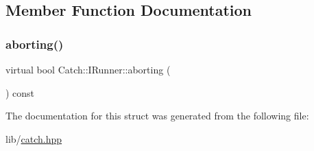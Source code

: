 \subsection{Member Function Documentation}
\hypertarget{struct_catch_1_1_i_runner_a03713202dd2e041e30b8030088ab0116}{}\label{struct_catch_1_1_i_runner_a03713202dd2e041e30b8030088ab0116} 
\subsubsection{\texorpdfstring{aborting()}{aborting()}}
{\footnotesize\ttfamily virtual bool Catch\+::\+I\+Runner\+::aborting (\begin{DoxyParamCaption}{ }\end{DoxyParamCaption}) const\hspace{0.3cm}{\ttfamily [pure virtual]}}



The documentation for this struct was generated from the following file\+:\begin{DoxyCompactItemize}
\item 
lib/\hyperlink{catch_8hpp}{catch.\+hpp}\end{DoxyCompactItemize}
